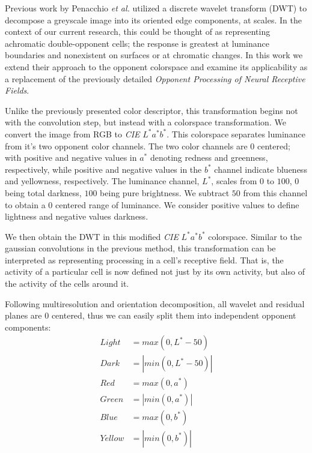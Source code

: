 \documentclass[journal,onecolumn]{IEEEtran}
\begin{document}
Previous work by Penacchio \textit{et al.} \cite{penacchio:2013} utilized a discrete wavelet transform (DWT) to decompose a greyscale image into its oriented edge components, at scales. In the context of our current research, this could be thought of as representing achromatic double-opponent cells; the response is greatest at luminance boundaries and nonexistent on surfaces or at chromatic changes. In this work we extend their approach to the opponent colorspace and examine its applicability as a replacement of the previously detailed \textit{Opponent Processing of Neural Receptive Fields}.

Unlike the previously presented color descriptor, this transformation begins not with the convolution step, but instead with a colorspace transformation. We convert the image from RGB to \textit{CIE} $L^*a^*b^*$. This colorspace separates luminance from it's two opponent color channels. The two color channels are $0$ centered; with positive and negative values in $a^*$ denoting redness and greenness, respectively, while positive and negative values in the $b^*$ channel indicate blueness and yellowness, respectively. The luminance channel, $L^*$, scales from $0$ to $100$, $0$ being total darkness, $100$ being pure brightness. We subtract $50$ from this channel to obtain a $0$ centered range of luminance. We consider positive values to define lightness and negative values darkness.

We then obtain the DWT in this modified \textit{CIE} $L^*a^*b^*$ colorspace. Similar to the gaussian convolutions in the previous method, this transformation can be interpreted as representing processing in a cell's receptive field. That is, the activity of a particular cell is now defined not just by its own activity, but also of the activity of the cells around it.

Following multiresolution and orientation decomposition, all wavelet and residual planes are $0$ centered, thus we can easily split them into independent opponent components:
\begin{align}
    Light  &=   max(0, L^*-50)   \\
    Dark   &= | min(0, L^*-50) | \\
    Red    &=   max(0, a^*)      \\
    Green  &= | min(0, a^*) |    \\
    Blue   &=   max(0, b^*)      \\
    Yellow &= | min(0, b^*) |
\end{align}
\end{document}
